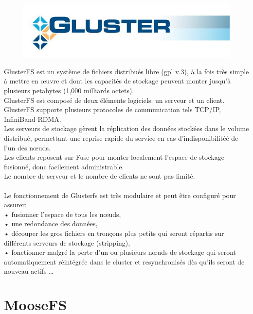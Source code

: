 \documentclass[12pt]{report}
\begin{document}
		\begin{figure}[H]
			\begin{center}
				\includegraphics[width=0.6\linewidth]{images/glusterfs.png}
			\end{center}
		\end{figure}

GlusterFS est un système de fichiers distribués libre (gpl v.3), à la fois très simple à mettre en œuvre et dont les capacités de stockage peuvent monter jusqu'à plusieurs petabytes (1,000 milliards octets).\\

GlusterFS est composé de deux éléments logiciels: un serveur et un client.\\
GlusterFS supporte plusieurs protocoles de communication tels TCP/IP, InfiniBand RDMA.\\

Les serveurs de stockage gèrent la réplication des données stockées dans le volume distribué, permettant une reprise rapide du service en cas d'indisponibilitéé de l'un des n\oe uds. \\
Les clients reposent sur Fuse pour monter localement l'espace de stockage fusionné, donc facilement administrable.\\
Le nombre de serveur et le nombre de clients ne sont pas limité.\\\\
Le fonctionnement de Glusterfs est très modulaire et peut être configuré pour assurer:\\
   • fusionner l'espace de tous les nœuds,\\
   • une redondance des données,\\
   • découper les gros fichiers en tronçons plus petits qui seront répartis sur différents serveurs de stockage (stripping),\\
   • fonctionner malgré la perte d'un ou plusieurs nœuds de stockage qui seront automatiquement réintégrée dans le cluster et resynchronisés dès qu'ils seront de nouveau actifs \dots \\


	\chapter{MooseFS}
\end{document}

